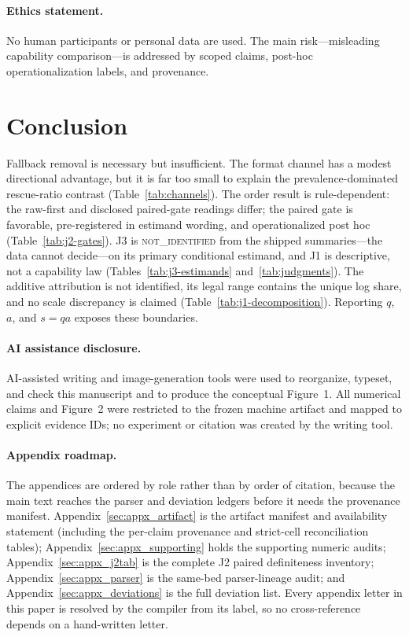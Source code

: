 \documentclass{article}
\begin{document}
\paragraph{Ethics statement.} No human participants or personal data are
used.  The main risk---misleading capability comparison---is addressed by
scoped claims, post-hoc operationalization labels, and provenance.

\section{Conclusion}
\label{sec:conclusion}

Fallback removal is necessary but insufficient.  The format channel has a
modest directional advantage, but it is far too small to explain the
prevalence-dominated rescue-ratio contrast (Table~\ref{tab:channels}).  The
order result is rule-dependent: the raw-first and disclosed paired-gate
readings differ; the paired gate is favorable, pre-registered in estimand
wording, and operationalized post hoc (Table~\ref{tab:j2-gates}).  J3 is
\textsc{not\_identified} from the shipped summaries---the data cannot
decide---on its primary conditional estimand, and J1 is descriptive, not a capability law
(Tables~\ref{tab:j3-estimands} and~\ref{tab:judgments}).  The additive
attribution is not identified, its legal range contains the unique log share,
and no scale discrepancy is claimed (Table~\ref{tab:j1-decomposition}).
Reporting $q$, $a$, and $s=qa$ exposes these boundaries.


\label{p5:main-text-end}


\paragraph{AI assistance disclosure.}
AI-assisted writing and image-generation tools were used to reorganize,
typeset, and check this manuscript and to produce the conceptual Figure~1.
All numerical claims and Figure~2 were restricted to the frozen machine
artifact and mapped to explicit evidence IDs; no experiment or citation was
created by the writing tool.

\appendix
\raggedbottom

\paragraph{Appendix roadmap.}
The appendices are ordered by role rather than by order of citation, because the
main text reaches the parser and deviation ledgers before it needs the provenance
manifest.  Appendix~\ref{sec:appx_artifact} is the artifact manifest and
availability statement (including the per-claim provenance and strict-cell
reconciliation tables); Appendix~\ref{sec:appx_supporting} holds the supporting
numeric audits; Appendix~\ref{sec:appx_j2tab} is the complete J2 paired
definiteness inventory; Appendix~\ref{sec:appx_parser} is the same-bed
parser-lineage audit; and Appendix~\ref{sec:appx_deviations} is the full
deviation list.  Every appendix letter in this paper is resolved by the
compiler from its label, so no cross-reference depends on a hand-written letter.
\end{document}
